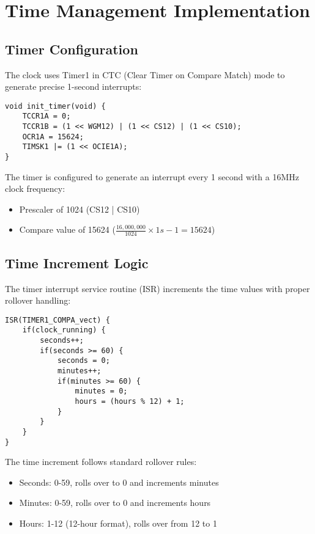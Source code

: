 \documentclass[12pt,a4paper]{article}
\begin{document}
\section{Time Management Implementation}

\subsection{Timer Configuration}

The clock uses Timer1 in CTC (Clear Timer on Compare Match) mode to generate precise 1-second interrupts:

\begin{lstlisting}
void init_timer(void) {
    TCCR1A = 0;
    TCCR1B = (1 << WGM12) | (1 << CS12) | (1 << CS10);
    OCR1A = 15624;
    TIMSK1 |= (1 << OCIE1A);
}
\end{lstlisting}

The timer is configured to generate an interrupt every 1 second with a 16MHz clock frequency:
\begin{itemize}
    \item Prescaler of 1024 (CS12 | CS10)
    \item Compare value of 15624 ($\frac{16,000,000}{1024} \times 1s - 1 = 15624$)
\end{itemize}

\subsection{Time Increment Logic}

The timer interrupt service routine (ISR) increments the time values with proper rollover handling:

\begin{lstlisting}
ISR(TIMER1_COMPA_vect) {
    if(clock_running) {
        seconds++;
        if(seconds >= 60) {
            seconds = 0;
            minutes++;
            if(minutes >= 60) {
                minutes = 0;
                hours = (hours % 12) + 1;
            }
        }
    }
}
\end{lstlisting}

The time increment follows standard rollover rules:
\begin{itemize}
    \item Seconds: 0-59, rolls over to 0 and increments minutes
    \item Minutes: 0-59, rolls over to 0 and increments hours
    \item Hours: 1-12 (12-hour format), rolls over from 12 to 1
\end{itemize}
\end{document}

